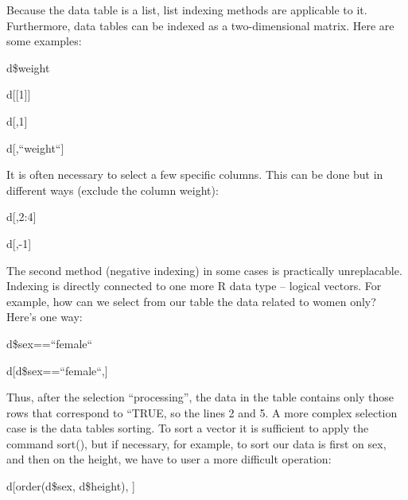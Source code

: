 \documentclass{beamer}
\begin{document}
\begin{frame}{}
Because the data table is a list, list indexing methods are applicable to it. Furthermore, data tables can be indexed as a two-dimensional matrix. Here are some examples:

\begin{center}

d\$weight

d[[1]]

d[,1]

d[,``weight``]


\end{center}
\end{frame}


\begin{frame}{}
It is often necessary to select a few specific columns. This can be done but in different ways (exclude the column weight):
\begin{center}
d[,2:4]

d[,-1]


\end{center}
\end{frame}


\begin{frame}{}
The second method (negative indexing) in some cases is practically unreplacable. Indexing is directly connected to one more R data type – logical vectors. For example, how can we select from our table the data related to women only? Here's one way:
\begin{center}

d\$sex==``female``

d[d\$sex==``female``,]


\end{center}
\end{frame}

\begin{frame}{}
Thus, after the selection “processing”, the data in the table contains only those rows that correspond to ``TRUE, so the lines 2 and 5.
A more complex selection case is the data tables sorting. To sort a vector it is sufficient to apply the command sort(), but if necessary, for example, to sort our data is first on sex, and then on the height, we have to user a more difficult operation:

\begin{center}

d[order(d\$sex, d\$height), ]


\end{center}
\end{frame}
\end{document}
